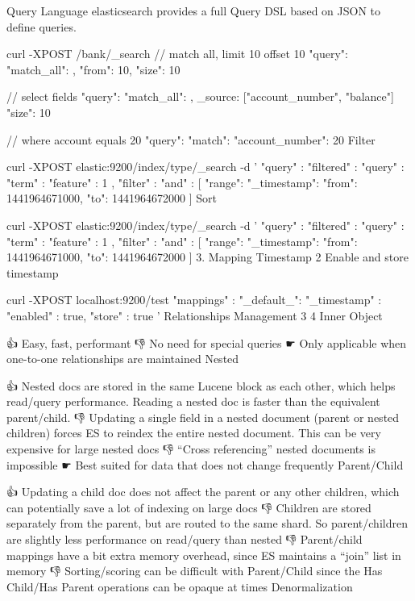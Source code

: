 Query Language
elasticsearch provides a full Query DSL based on JSON to define queries.

curl -XPOST /bank/_search
// match all, limit 10 offset 10
{
  "query": { "match_all": {} },
  "from": 10,
  "size": 10
}

// select fields
{
  "query": { "match_all": {} },
  _source: ["account_number", "balance"]
  "size": 10
}

// where account equals 20
{
  "query": { "match": { "account_number": 20 } }
}
Filter

curl -XPOST elastic:9200/index/type/_search -d '
{
  "query" : {
    "filtered" :
    {
      "query" : { "term" : { "feature" : 1 } } ,
      "filter" : {
        "and" : [
          {
            "range": {
              "_timestamp": {
                "from": 1441964671000,
                "to": 1441964672000
              }
            }
          }
        ]
      }
    }
  }
}
Sort

curl -XPOST elastic:9200/index/type/_search -d '
{
  "query" : {
    "filtered" :
    {
      "query" : { "term" : { "feature" : 1 } } ,
      "filter" : {
        "and" : [
          {
            "range": {
              "_timestamp": {
                "from": 1441964671000,
                "to": 1441964672000
              }
            }
          }
        ]
      }
    }
  }
}
3. Mapping
Timestamp 2
Enable and store timestamp

curl -XPOST localhost:9200/test
{
"mappings" : {
    "_default_":{
        "_timestamp" : {
            "enabled" : true,
            "store" : true
        }
    }
  }
}'
Relationships Management 3 4
Inner Object

👍 Easy, fast, performant
👎 No need for special queries
☛ Only applicable when one-to-one relationships are maintained
Nested

👍 Nested docs are stored in the same Lucene block as each other, which helps read/query performance. Reading a nested doc is faster than the equivalent parent/child.
👎 Updating a single field in a nested document (parent or nested children) forces ES to reindex the entire nested document. This can be very expensive for large nested docs
👎 “Cross referencing” nested documents is impossible
☛ Best suited for data that does not change frequently
Parent/Child

👍 Updating a child doc does not affect the parent or any other children, which can potentially save a lot of indexing on large docs
👎 Children are stored separately from the parent, but are routed to the same shard. So parent/children are slightly less performance on read/query than nested
👎 Parent/child mappings have a bit extra memory overhead, since ES maintains a “join” list in memory
👎 Sorting/scoring can be difficult with Parent/Child since the Has Child/Has Parent operations can be opaque at times
Denormalization

